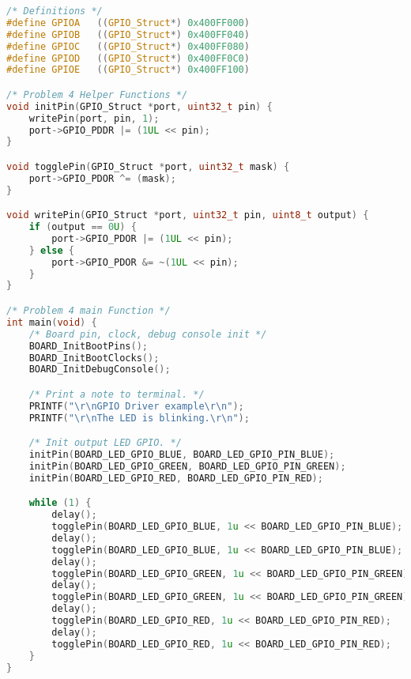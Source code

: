 \begin{lstlisting}[language=c,caption=Problem 4, label=list:p4]
/* Definitions */
#define GPIOA	((GPIO_Struct*) 0x400FF000)
#define GPIOB	((GPIO_Struct*) 0x400FF040)
#define GPIOC	((GPIO_Struct*) 0x400FF080)
#define GPIOD	((GPIO_Struct*) 0x400FF0C0)
#define GPIOE	((GPIO_Struct*) 0x400FF100)

/* Problem 4 Helper Functions */
void initPin(GPIO_Struct *port, uint32_t pin) {
	writePin(port, pin, 1);
	port->GPIO_PDDR |= (1UL << pin);
}

void togglePin(GPIO_Struct *port, uint32_t mask) {
	port->GPIO_PDOR ^= (mask);
}

void writePin(GPIO_Struct *port, uint32_t pin, uint8_t output) {
	if (output == 0U) {
		port->GPIO_PDOR |= (1UL << pin);
	} else {
		port->GPIO_PDOR &= ~(1UL << pin);
	}
}

/* Problem 4 main Function */
int main(void) {
    /* Board pin, clock, debug console init */
    BOARD_InitBootPins();
    BOARD_InitBootClocks();
    BOARD_InitDebugConsole();

    /* Print a note to terminal. */
    PRINTF("\r\nGPIO Driver example\r\n");
    PRINTF("\r\nThe LED is blinking.\r\n");

    /* Init output LED GPIO. */
    initPin(BOARD_LED_GPIO_BLUE, BOARD_LED_GPIO_PIN_BLUE);
    initPin(BOARD_LED_GPIO_GREEN, BOARD_LED_GPIO_PIN_GREEN);
    initPin(BOARD_LED_GPIO_RED, BOARD_LED_GPIO_PIN_RED);

    while (1) {
        delay();
        togglePin(BOARD_LED_GPIO_BLUE, 1u << BOARD_LED_GPIO_PIN_BLUE);
        delay();
        togglePin(BOARD_LED_GPIO_BLUE, 1u << BOARD_LED_GPIO_PIN_BLUE);
        delay();
        togglePin(BOARD_LED_GPIO_GREEN, 1u << BOARD_LED_GPIO_PIN_GREEN);
        delay();
        togglePin(BOARD_LED_GPIO_GREEN, 1u << BOARD_LED_GPIO_PIN_GREEN);
        delay();
        togglePin(BOARD_LED_GPIO_RED, 1u << BOARD_LED_GPIO_PIN_RED);
        delay();
        togglePin(BOARD_LED_GPIO_RED, 1u << BOARD_LED_GPIO_PIN_RED);
    }
}
\end{lstlisting}
